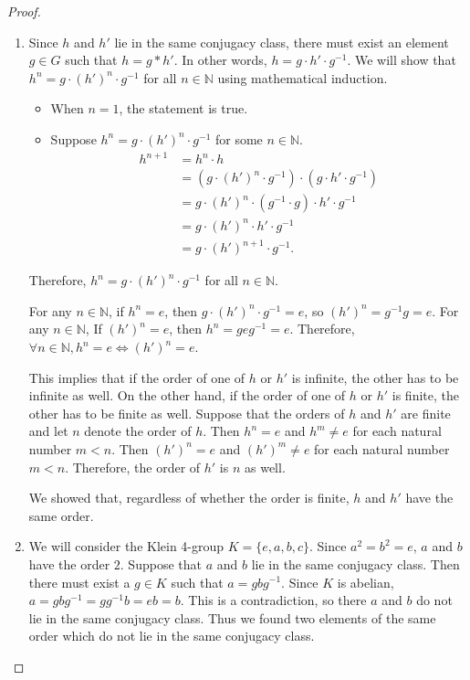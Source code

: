 \documentclass[12pt, psamsfonts]{amsart}
\theoremstyle{definition}
\theoremstyle{remark}
\numberwithin{equation}{section}
\begin{document}
\begin{proof}
  \begin{enumerate}
    \item
      Since $h$ and $h'$ lie in the same conjugacy class, there must exist an element $g \in G$ such that $h = g * h'$.
      In other words, $h = g \cdot h' \cdot g^{-1}$.
      We will show that $h^n = g \cdot (h')^n \cdot g^{-1}$ for all $n \in \mathbb{N}$ using mathematical induction.
      \begin{itemize}
        \item
          When $n = 1$, the statement is true.
        \item
          Suppose $h^n = g \cdot (h')^n \cdot g^{-1}$ for some $n \in \mathbb{N}$.
          \begin{align*}
            h^{n + 1}
              &= h^n \cdot h \\
              &= (g \cdot (h')^n \cdot g^{-1}) \cdot (g \cdot h' \cdot g^{-1}) \\
              &= g \cdot (h')^n \cdot (g^{-1} \cdot g) \cdot h' \cdot g^{-1} \\
              &= g \cdot (h')^n \cdot h' \cdot g^{-1} \\
              &= g \cdot (h')^{n + 1} \cdot g^{-1}.
          \end{align*}
      \end{itemize}
      Therefore, $h^n = g \cdot (h')^n \cdot g^{-1}$ for all $n \in \mathbb{N}$.

      For any $n \in \mathbb{N}$, if $h^n = e$, then $g \cdot (h')^n \cdot g^{-1} = e$, so $(h')^n = g^{-1}g = e$.
      For any $n \in \mathbb{N}$, If $(h')^n = e$, then $h^n = geg^{-1} = e$.
      Therefore, $\forall n \in \mathbb{N}, h^n = e \iff (h')^n = e$.

      This implies that if the order of one of $h$ or $h'$ is infinite, the other has to be infinite as well.
      On the other hand, if the order of one of $h$ or $h'$ is finite, the other has to be finite as well.
      Suppose that the orders of $h$ and $h'$ are finite and let $n$ denote the order of $h$.
      Then $h^n = e$ and $h^m \ne e$ for each natural number $m < n$.
      Then $(h')^n = e$ and $(h')^m \ne e$ for each natural number $m < n$.
      Therefore, the order of $h'$ is $n$ as well.

      We showed that, regardless of whether the order is finite, $h$ and $h'$ have the same order.
    \item
      We will consider the Klein 4-group $K = \{ e, a, b, c \}$.
      Since $a^2 = b^2 = e$, $a$ and $b$ have the order $2$.
      Suppose that $a$ and $b$ lie in the same conjugacy class.
      Then there must exist a $g \in K$ such that $a = gbg^{-1}$.
      Since $K$ is abelian, $a = gbg^{-1} = gg^{-1}b = eb = b$.
      This is a contradiction, so there $a$ and $b$ do not lie in the same conjugacy class.
      Thus we found two elements of the same order which do not lie in the same conjugacy class.
  \end{enumerate}
\end{proof}
\end{document}
